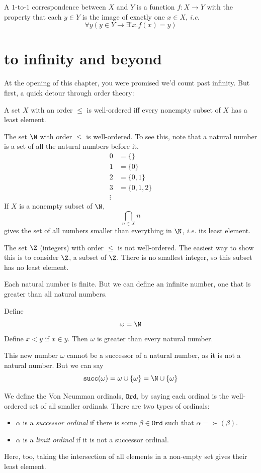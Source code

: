 \documentclass{scrbook}
\renewcommand{\implies}{\to}
\newcommand{\ie}{\emph{i.e.}\xspace}
\newcommand{\ord}{\mathtt{Ord}}
\begin{document}
\begin{defn}[$1$-to-$1$ correspondence]
  A $1$-to-$1$ correspondence between $X$ and $Y$ is a function $f:X\to Y$ with the property that each $y\in Y$ is the image of exactly one $x\in X$, \ie 
  \[
  \forall y (y\in Y\implies \exists! x . f(x)=y)
  \]
\end{defn}

\section[To infinity and beyond]{to infinity and beyond}
At the opening of this chapter, you were promised we'd count past infinity. But first, a quick detour through order theory: 
\begin{defn}
  \label{def:well-ordered}
  A set $X$ with an order $\leq$ is well-ordered iff every nonempty subset of $X$ has a least element. 
\end{defn}
\begin{example}
  The set $\N$ with order $\leq$ is well-ordered. To see this, note that a natural number is a set of all the natural numbers before it.
  \begin{align*}
    0 &= \{\} \\
    1 &= \{0\}\\
    2 &= \{0,1\}\\
    3 &= \{0,1,2\}\\
    \vdots 
  \end{align*}
  If $X$ is a nonempty subset of $\N$,
  \[
  \bigcap_{n\in X} n 
  \]
  gives the set of all numbers smaller than everything in $\N$, \ie its least element. 
\end{example}
\begin{example}
  The set $\Z$ (integers) with order $\leq$ is not well-ordered. The easiest way to show this is to consider $\Z$, a subset of $\Z$. There is no smallest integer, so this subset has no least element. 
\end{example}
Each natural number is finite. But we can define an infinite number, one that is greater than all natural numbers.
\begin{defn}[\omega]
  Define
  \[
  \omega=\N
  \]
  Define $x<y$ if $x\in y$. Then $\omega$ is greater than every natural number. 
\end{defn}
This new number $\omega$ cannot be a successor of a natural number, as it is not a natural number. But we can say
\[
\succ(\omega) = \omega \cup \{\omega\} = \N \cup \{\omega\}
\]
\begin{defn}[ordinals]
  We define the Von Neumman ordinals, $\ord$, by saying each ordinal is the well-ordered set of all smaller ordinals. There are two types of ordinals:
  \begin{itemize}
  \item $\alpha$ is a \emph{successor ordinal} if there is some $\beta \in \ord$ such that $\alpha=\succ(\beta)$. 
  \item $\alpha$ is a \emph{limit ordinal} if it is not a successor ordinal. 
  \end{itemize}
  Here, too, taking the intersection of all elements in a non-empty set gives their least element. 
\end{defn}
\end{document}
